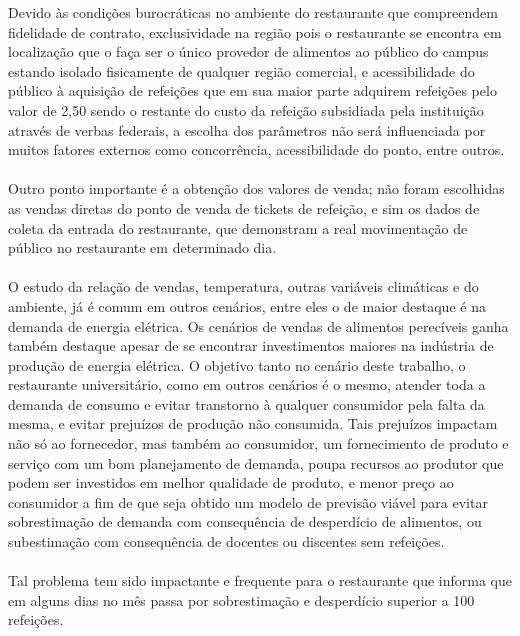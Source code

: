 \documentclass[	12pt, Times, openright, twoside, a4paper, english, brazil]{abntex2}
\begin{document}
Devido às condições burocráticas no ambiente do restaurante que compreendem fidelidade de contrato, exclusividade na região pois o restaurante se encontra em localização que o faça ser o único provedor de alimentos ao público do campus estando isolado fisicamente de qualquer região comercial, e acessibilidade do público à aquisição de refeições que em sua maior parte adquirem refeições pelo valor de 2,50 sendo o restante do custo da refeição subsidiada pela instituição através de verbas federais, a escolha dos parâmetros não será influenciada por muitos fatores externos como concorrência, acessibilidade do ponto, entre outros.

\paragraph*{} Outro ponto importante é a obtenção dos valores de venda; não foram escolhidas as vendas diretas do ponto de venda de tickets de refeição, e sim os dados de coleta da entrada do restaurante, que demonstram a real movimentação de público no restaurante em determinado dia.

\paragraph*{} O estudo da relação de vendas, temperatura, outras variáveis climáticas e do ambiente, já é comum em outros cenários, entre eles o de maior destaque é na demanda de energia elétrica. Os cenários de vendas de alimentos perecíveis ganha também destaque apesar de se encontrar investimentos maiores na indústria de produção de energia elétrica. O objetivo tanto no cenário deste trabalho, o restaurante universitário, como em outros cenários é o mesmo, atender toda a demanda de consumo e evitar transtorno à qualquer consumidor pela falta da mesma, e evitar prejuízos de produção não consumida. Tais prejuízos impactam não só ao fornecedor, mas também ao consumidor, um fornecimento de produto e serviço com um bom planejamento de demanda, poupa recursos ao produtor que podem ser investidos em melhor qualidade de produto, e menor preço ao consumidor a fim de que seja obtido um modelo de previsão viável para evitar sobrestimação de demanda com consequência de desperdício de alimentos, ou subestimação com consequência de docentes ou discentes sem refeições. 

\paragraph*{} Tal problema tem sido impactante e frequente para o restaurante que informa que em alguns
dias no mês passa por sobrestimação e desperdício superior a 100 refeições. 
\end{document}
